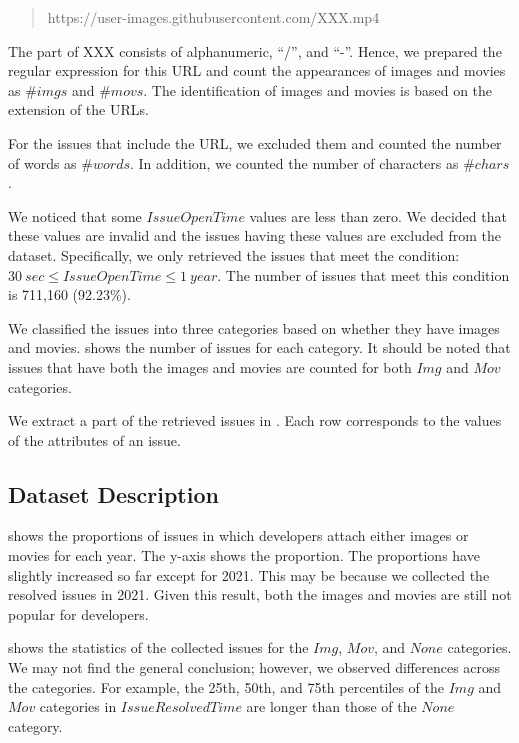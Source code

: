 \begin{quote}
	https://user-images.githubusercontent.com/XXX.mp4
\end{quote}

\noindent{}
The part of XXX consists of alphanumeric, ``/'', and ``-''.
Hence, we prepared the regular expression for this URL and 
count the appearances of images and movies as $\#imgs$ and $\#movs$. 
The identification of images and movies is based on the extension of 
the URLs. 

For the issues that include the URL, we excluded them and 
counted the number of words as $\#words$. 
In addition, we counted the number of characters as $\#chars$. 

We noticed that some $IssueOpenTime$ values are less than zero. 
We decided that these values are invalid and the issues having 
these values are excluded from the dataset. 
Specifically, we only retrieved the issues that meet 
the condition: $30\ sec \leq IssueOpenTime \leq 1\ year$.
The number of issues that meet this condition is 711,160 (92.23\%).



We classified the issues into three categories based on 
whether they have images and movies. 
 shows the number of issues for each category. 
It should be noted that issues that have both 
the images and movies are counted for both 
$Img$ and $Mov$ categories. 



We extract a part of the retrieved issues in . 
Each row corresponds to the values of the attributes of an issue. 

\subsection{Dataset Description}



 shows the proportions of 
issues in which developers attach either 
images or movies for each year. 
The y-axis shows the proportion. 
The proportions have slightly increased so far 
except for 2021. 
This may be because we collected the resolved issues 
in 2021. 
Given this result, both the images and movies are still 
not popular for developers. 




 shows the statistics
of the collected issues for the $Img$, $Mov$,
and $None$ categories.
We may not find the general conclusion; 
however, we observed differences across the categories. 
For example, the 25th, 50th, and 75th percentiles of 
the $Img$ and $Mov$ categories in $IssueResolvedTime$ are 
longer than those of the $None$ category. 